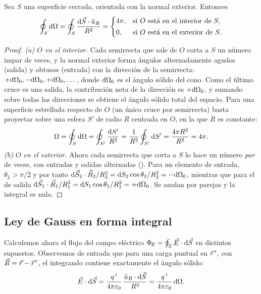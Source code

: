 

\begin{lema}\label{lema:omega-4pi}
Sea $S$ una superficie cerrada, orientada con la normal exterior. Entonces
\begin{equation}\label{eq:omega}
  \oint_{S}\mathrm{d}\Omega=\oint_{S}\frac{\mathrm{d}\vec{S}\cdot\hat{u}_{R}}{R^{2}}=\begin{cases}4\pi,&\text{si $O$ está en el interior de $S$,}\\[2pt]0,&\text{si $O$ está en el exterior de $S$.}\end{cases}
\end{equation}
\end{lema}
\begin{proof}
\emph{(a) $O$ en el interior.} Cada semirrecta que sale de $O$ corta a $S$ un número impar de veces, y la
normal exterior forma ángulos alternadamente agudos (salida) y obtusos (entrada) con la dirección de la semirrecta:
$+\mathrm{d}\Omega_0,-\mathrm{d}\Omega_0,+\mathrm{d}\Omega_0,\dots$, donde $\mathrm{d}\Omega_0$ es el ángulo sólido del cono. Como el último cruce es una
salida, la contribución neta de la dirección es $+\mathrm{d}\Omega_0$, y sumando sobre todas las direcciones se obtiene el ángulo sólido
total del espacio. Para una superficie estrellada respecto de $O$ (un único cruce por semirrecta) basta proyectar sobre una esfera
$S'$ de radio $R$ centrada en $O$, en la que $R$ es constante:
\[
  \Omega=\oint_{S}\mathrm{d}\Omega=\oint_{S'}\frac{\mathrm{d} S'}{R^{2}}=\frac{1}{R^{2}}\oint_{S'}\mathrm{d} S'=\frac{4\pi R^{2}}{R^{2}}=4\pi .
\]
\emph{(b) $O$ en el exterior.} Ahora cada semirrecta que corta a $S$ lo hace un número \emph{par} de veces, con entradas y
salidas alternadas (). Para un elemento de entrada, $\theta_2>\pi/2$ y por tanto
$\mathrm{d}\vec{S}_2\cdot\vec{R}_2/R_2^{3}=\mathrm{d} S_2\cos\theta_2/R_2^{2}=-\mathrm{d}\Omega_0$, mientras que para el de salida
$\mathrm{d}\vec{S}_1\cdot\vec{R}_1/R_1^{3}=\mathrm{d} S_1\cos\theta_1/R_1^{2}=+\mathrm{d}\Omega_0$. Se anulan por parejas y la integral es nula.
\end{proof}

\subsection{Ley de Gauss en forma integral}\label{sec:gauss-integral}
Calculemos ahora el flujo del campo eléctrico $\Phi_{\!E}=\oint_{S}\vec{E}\cdot\mathrm{d}\vec{S}$ en distintos supuestos. Observemos de entrada que
para una carga puntual en $\vec{r}\,'$, con $\vec{R}=\vec{r}-\vec{r}\,'$, el integrando contiene exactamente el ángulo sólido:
\[
  \vec{E}\cdot\mathrm{d}\vec{S}=\frac{q\,'}{4\pi\varepsilon_{0}}\,\frac{\hat{u}_{R}\cdot\mathrm{d}\vec{S}}{R^{2}}=\frac{q\,'}{4\pi\varepsilon_{0}}\,\mathrm{d}\Omega .
\]

